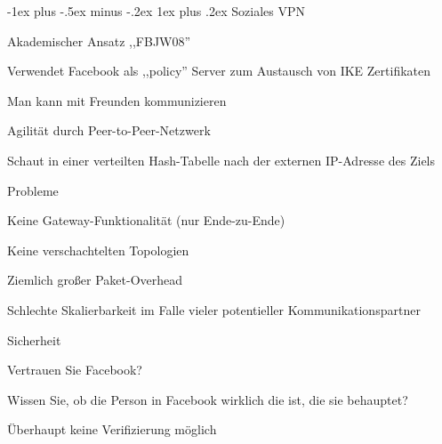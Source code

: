 \documentclass[a4paper]{article}
\makeatletter
\renewcommand{\subsubsection}{\@startsection{subsubsection}{3}{0mm}%
 {-1ex plus -.5ex minus -.2ex}%
 {1ex plus .2ex}%
 {\normalfont\small\bfseries}}
\makeatother
\begin{document}
\begin{multicols}{3}
      \subsubsection{Soziales VPN}
      \begin{itemize*}
            \item Akademischer Ansatz ,,FBJW08''
            \item Verwendet Facebook als ,,policy'' Server zum Austausch von IKE Zertifikaten
            \begin{itemize*}
                  \item Man kann mit Freunden kommunizieren
            \end{itemize*}
            \item Agilität durch Peer-to-Peer-Netzwerk
            \begin{itemize*}
                  \item Schaut in einer verteilten Hash-Tabelle nach der externen IP-Adresse des Ziels
            \end{itemize*}
            \item Probleme
            \begin{itemize*}
                  \item Keine Gateway-Funktionalität (nur Ende-zu-Ende)
                  \item Keine verschachtelten Topologien
                  \item Ziemlich großer Paket-Overhead
                  \item Schlechte Skalierbarkeit im Falle vieler potentieller Kommunikationspartner
                  \item Sicherheit
                  \begin{itemize*}
                        \item Vertrauen Sie Facebook?
                        \item Wissen Sie, ob die Person in Facebook wirklich die ist, die sie behauptet?
                        \item Überhaupt keine Verifizierung möglich
                  \end{itemize*}
            \end{itemize*}
      \end{itemize*}


\end{multicols}
\end{document}
